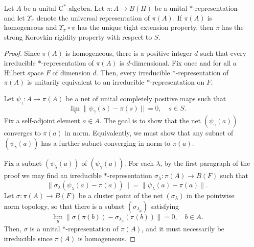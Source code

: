 \documentclass[10pt,a4paper]{amsart}
\newcommand{\rC}{\mathrm{C}}
\begin{document}
\begin{theorem}\label{T:normhomo}
Let $A$ be a unital  $\rC^*$-algebra. Let $\pi:A\to B(H)$ be a unital $*$-representation and let $\Upsilon_\pi$ denote the universal representation of $\pi(A)$. If $\pi(A)$ is homogeneous and $\Upsilon_\pi\circ \pi$ has the unique tight extension property, then $\pi$ has the strong Korovkin rigidity property with respect to $S$.
\end{theorem}

\begin{proof}
Since $\pi(A)$ is homogeneous, there is a positive integer $d$ such that every irreducible $*$-representation of $\pi(A)$ is $d$-dimensional. Fix once and for all a Hilbert space $F$ of dimension $d$. Then, every irreducible $*$-representation of $\pi(A)$ is unitarily equivalent to an irreducible $*$-representation on $F$. 

Let $\psi_\gamma:A\to \pi(A)$ be a net of unital completely positive maps such that 
\[
\lim_\gamma\|\psi_\gamma(s)-\pi(s)\|=0, \quad s\in S.
\]
Fix a self-adjoint element $a\in A$. The goal is to show that the net $(\psi_\gamma(a))$ converges to $\pi(a)$ in norm. Equivalently, we must show that any subnet of $(\psi_\gamma(a))$ has a further subnet converging in norm to $\pi(a)$.

Fix  a subnet  $(\psi_\lambda(a))$ of $(\psi_\gamma(a))$. For each $\lambda$, by the first paragraph of the proof we may find an irreducible $*$-representation $\sigma_\lambda:\pi(A)\to B(F)$ such that 
\begin{equation}\label{Eq:normrep}
\|\sigma_\lambda(\psi_\lambda(a)-\pi(a))\|=\|\psi_\lambda(a)-\pi(a)\|.
\end{equation}
Let $\sigma:\pi(A)\to B(F)$ be a cluster point of the net $(\sigma_\lambda)$ in the pointwise norm topology, so that there is a subnet $(\sigma_{\lambda_\mu})$ satisfying
\begin{equation}\label{Eq:conv1}
\lim_\mu\|\sigma(\pi(b))-\sigma_{\lambda_\mu}(\pi(b))\|=0, \quad b\in A.
\end{equation}
Then, $\sigma$ is a unital $*$-representation of $\pi(A)$, and it must necessarily be irreducible since $\pi(A)$ is homogeneous.




\end{proof}
\end{document}
